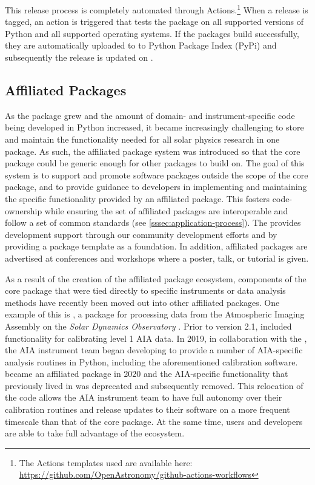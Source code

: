 This release process is completely automated through \github Actions.\footnote{The \github Actions templates used are available here: \url{https://github.com/OpenAstronomy/github-actions-workflows}}
When a release is tagged, an action is triggered that tests the package on all supported versions of Python and all supported operating systems.
If the packages build successfully, they are automatically uploaded to to Python Package Index (PyPi) and subsequently the release is updated on .

\subsection{Affiliated Packages}
\label{ssec:affiliated-packages}

As the \sunpypkg package grew and the amount of domain- and instrument-specific code being developed in Python increased, it became increasingly challenging to store and maintain the functionality needed for all solar physics research in one package.
As such, the affiliated package system was introduced \citep{mumford_stuart_2014_3261752} so that the \sunpypkg core package could be generic enough for other packages to build on.
The goal of this system is to support and promote software packages outside the scope of the \sunpypkg core package, and to provide guidance to developers in implementing and maintaining the specific functionality provided by an affiliated package.
This fosters code-ownership while ensuring the set of affiliated packages are interoperable and follow a set of common standards (see \autoref{sssec:application-process}).
The \sunpyproj provides development support through our community development efforts and by providing a package template as a foundation.
In addition, affiliated packages are advertised at conferences and workshops where a \sunpy poster, talk, or tutorial is given.

As a result of the creation of the affiliated package ecosystem, components of the \sunpypkg core package that were tied directly to specific instruments or data analysis methods have recently been moved out into other affiliated packages.
One example of this is \aiapypkg \citep{barnes_aiapy_2020}, a package for processing data from the Atmospheric Imaging Assembly \citep[AIA,][]{lemen_atmospheric_2012} on the \textit{Solar Dynamics Observatory} \citep[SDO,][]{pesnell_solar_2012}.
Prior to version 2.1, \sunpypkg included functionality for calibrating level 1 AIA data.
In 2019, in collaboration with the \sunpyproj, the AIA instrument team began developing \aiapypkg to provide a number of AIA-specific analysis routines in Python, including the aforementioned calibration software.
\aiapypkg became an affiliated package in 2020 and the AIA-specific functionality that previously lived in \sunpypkg was deprecated and subsequently removed.
This relocation of the code allows the AIA instrument team to have full autonomy over their calibration routines and release updates to their software on a more frequent timescale than that of the \sunpypkg core package.
At the same time, \aiapypkg users and developers are able to take full advantage of the \sunpyproj ecosystem.

